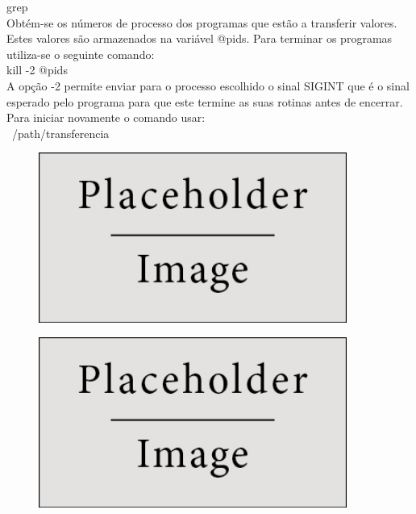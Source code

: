 \documentclass[11pt,twoside,a4paper]{report}
\begin{document}
grep\\
Obtém-se os números de processo dos programas que estão a transferir valores. Estes valores são armazenados na variável @pids. Para terminar os programas utiliza-se o seguinte comando:\\
kill -2 @pids\\
A opção -2 permite enviar para o processo escolhido o sinal SIGINT que é o sinal esperado pelo programa para que este termine as suas rotinas antes de encerrar. Para iniciar novamente o comando usar:\\
~/path/transferencia
\begin{figure}[H]
	\centering
	\begin{minipage}{.5\textwidth}
		\begin{center}
			\includegraphics[width=0.9\textwidth]{placeholder} %
			\label{fig:admin5}
		\end{center}
	\end{minipage}%
	\begin{minipage}{.5\textwidth}
		\begin{center}
			\includegraphics[width=0.9\textwidth]{placeholder} %
			\label{fig:admin6}

\end{center}
\end{minipage}
\end{figure}
\end{document}
